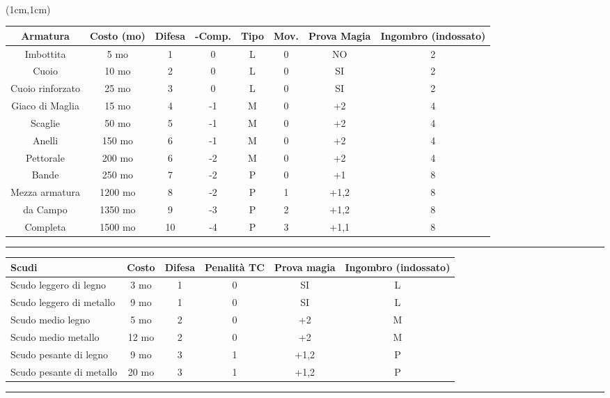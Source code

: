 \documentclass[a4paper,12 pt,openany]{book}
\newcommand{\riga}{\rule{\textwidth}{0.4pt}}
\begin{document}
~\newpage

\begin{textblock*}{18cm}(1cm,1cm) %

\begin{tabular}{cccccccc}
\textbf{Armatura} & \textbf{Costo (mo)} & \textbf{Difesa} & \textbf{-Comp.} &  \textbf{Tipo} & \textbf{Mov.} & \textbf{Prova Magia}&\textbf{Ingombro (indossato)}\\
\hline
Imbottita & 5 mo & 1 & 0 & L & 0 & NO&2\\
Cuoio & 10 mo & 2 & 0  & L & 0 & SI&2\\
Cuoio rinforzato& 25 mo  & 3  & 0   & L & 0 & SI&2\\
Giaco di Maglia & 15 mo & 4  & -1  & M & 0 &+2&4\\
Scaglie& 50 mo & 5  & -1  & M & 0 &+2&4\\
Anelli & 150 mo & 6  & -1  & M & 0 &+2&4\\
Pettorale  & 200 mo & 6  & -2  & M & 0 &+2&4\\
Bande & 250 mo & 7  & -2  & P & 0 &+1&8\\
Mezza armatura  & 1200 mo& 8  & -2  & P & 1 &+1,2&8\\
da Campo& 1350 mo& 9  & -3  & P & 2 &+1,2&8\\
Completa& 1500 mo& 10 & -4  & P & 3 &+1,1&8\\
\end{tabular}

\riga

\begin{tabular}{lccccc}
\textbf{Scudi} & \textbf{Costo} & \textbf{Difesa} & \textbf{Penalità TC} & \textbf{Prova magia} &  \textbf{Ingombro (indossato)}\\
\hline
Scudo leggero di legno 	 & 	3 mo  	&  1	& 0& SI	  	& L\\
Scudo leggero di metallo & 	9 mo  	&  1	& 0& SI	  	& L\\
Scudo medio legno		 &	5 mo 	&  2	& 0& +2		& M\\
Scudo medio metallo	 	 &	12 mo  	&  2  	& 0& +2  	& M\\
Scudo pesante di legno   & 	9  mo  	&  3 	& 1& +1,2  	& P\\
Scudo pesante di metallo & 	20 mo  	&  3	& 1& +1,2  	& P\\
\end{tabular}

\riga



\end{textblock*}
\end{document}
